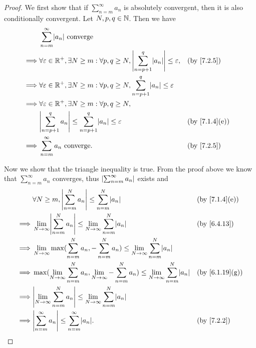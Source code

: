 \begin{proof}
  We first show that if \(\sum_{n = m}^\infty a_n\) is absolutely convergent, then it is also conditionally convergent.
  Let \(N, p, q \in \mathbb{N}\).
  Then we have
  \begin{align*}
             & \sum_{n = m}^\infty \abs{a_n} \text{ converge}                                                                                                \\
    \implies & \forall \varepsilon \in \R^+, \exists N \geq m : \forall p, q \geq N, \abs{\sum_{n = p + 1}^q \abs{a_n}} \leq \varepsilon, &  & \by{7.2.5}    \\
    \implies & \forall \varepsilon \in \R^+, \exists N \geq m : \forall p, q \geq N, \sum_{n = p + 1}^q \abs{a_n} \leq \varepsilon                           \\
    \implies & \forall \varepsilon \in \R^+, \exists N \geq m : \forall p, q \geq N,                                                                         \\
             & \abs{\sum_{n = p + 1}^q a_n} \leq \sum_{n = p + 1}^q \abs{a_n} \leq \varepsilon                                            &  & \by{7.1.4}[e] \\
    \implies & \sum_{n = m}^\infty a_n \text{ converge}.                                                                                  &  & \by{7.2.5}
  \end{align*}

  Now we show that the triangle inequality is true.
  From the proof above we know that \(\sum_{n = m}^\infty a_n\) converges, thus \(\left\lvert\sum_{n = m}^\infty a_n\right\rvert\) exists and
  \begin{align*}
             & \forall N \geq m, \abs{\sum_{n = m}^N a_n} \leq \sum_{n = m}^N \abs{a_n}                                                                &  & \by{7.1.4}[e]  \\
    \implies & \lim_{N \to \infty} \abs{\sum_{n = m}^N a_n} \leq \lim_{N \to \infty} \sum_{n = m}^N \abs{a_n}                                          &  & \by{6.4.13}    \\
    \implies & \lim_{N \to \infty} \max(\sum_{n = m}^N a_n, -\sum_{n = m}^N a_n) \leq \lim_{N \to \infty} \sum_{n = m}^N \abs{a_n}                                         \\
    \implies & \max(\lim_{N \to \infty} \sum_{n = m}^N a_n, \lim_{N \to \infty} -\sum_{n = m}^N a_n) \leq \lim_{N \to \infty} \sum_{n = m}^N \abs{a_n} &  & \by{6.1.19}[g] \\
    \implies & \abs{\lim_{N \to \infty} \sum_{n = m}^N a_n} \leq \lim_{N \to \infty} \sum_{n = m}^N \abs{a_n}                                                              \\
    \implies & \abs{\sum_{n = m}^\infty a_n} \leq \sum_{n = m}^\infty \abs{a_n}.                                                                       &  & \by{7.2.2}
  \end{align*}
\end{proof}

